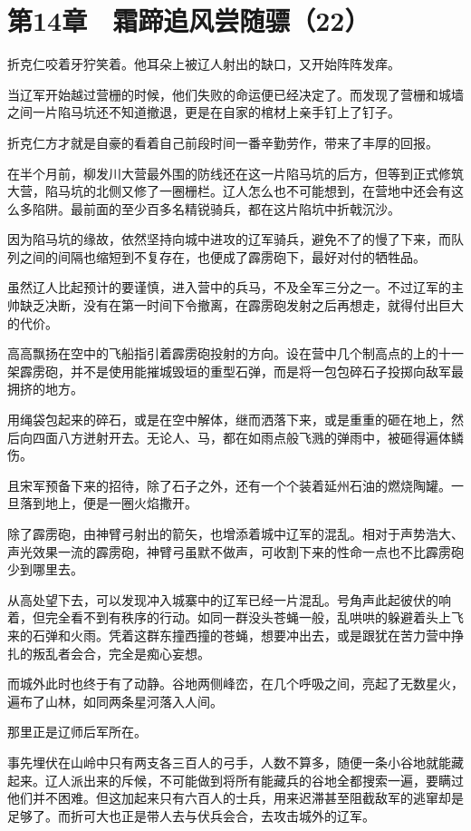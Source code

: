 \section{第14章　霜蹄追风尝随骠（22）}

折克仁咬着牙狞笑着。他耳朵上被辽人射出的缺口，又开始阵阵发痒。

当辽军开始越过营栅的时候，他们失败的命运便已经决定了。而发现了营栅和城墙之间一片陷马坑还不知道撤退，更是在自家的棺材上亲手钉上了钉子。

折克仁方才就是自豪的看着自己前段时间一番辛勤劳作，带来了丰厚的回报。

在半个月前，柳发川大营最外围的防线还在这一片陷马坑的后方，但等到正式修筑大营，陷马坑的北侧又修了一圈栅栏。辽人怎么也不可能想到，在营地中还会有这么多陷阱。最前面的至少百多名精锐骑兵，都在这片陷坑中折戟沉沙。

因为陷马坑的缘故，依然坚持向城中进攻的辽军骑兵，避免不了的慢了下来，而队列之间的间隔也缩短到不复存在，也便成了霹雳砲下，最好对付的牺牲品。

虽然辽人比起预计的要谨慎，进入营中的兵马，不及全军三分之一。不过辽军的主帅缺乏决断，没有在第一时间下令撤离，在霹雳砲发射之后再想走，就得付出巨大的代价。

高高飘扬在空中的飞船指引着霹雳砲投射的方向。设在营中几个制高点的上的十一架霹雳砲，并不是使用能摧城毁垣的重型石弹，而是将一包包碎石子投掷向敌军最拥挤的地方。

用绳袋包起来的碎石，或是在空中解体，继而洒落下来，或是重重的砸在地上，然后向四面八方迸射开去。无论人、马，都在如雨点般飞溅的弹雨中，被砸得遍体鳞伤。

且宋军预备下来的招待，除了石子之外，还有一个个装着延州石油的燃烧陶罐。一旦落到地上，便是一圈火焰撒开。

除了霹雳砲，由神臂弓射出的箭矢，也增添着城中辽军的混乱。相对于声势浩大、声光效果一流的霹雳砲，神臂弓虽默不做声，可收割下来的性命一点也不比霹雳砲少到哪里去。

从高处望下去，可以发现冲入城寨中的辽军已经一片混乱。号角声此起彼伏的响着，但完全看不到有秩序的行动。如同一群没头苍蝇一般，乱哄哄的躲避着头上飞来的石弹和火雨。凭着这群东撞西撞的苍蝇，想要冲出去，或是跟犹在苦力营中挣扎的叛乱者会合，完全是痴心妄想。

而城外此时也终于有了动静。谷地两侧峰峦，在几个呼吸之间，亮起了无数星火，遍布了山林，如同两条星河落入人间。

那里正是辽师后军所在。

事先埋伏在山岭中只有两支各三百人的弓手，人数不算多，随便一条小谷地就能藏起来。辽人派出来的斥候，不可能做到将所有能藏兵的谷地全都搜索一遍，要瞒过他们并不困难。但这加起来只有六百人的士兵，用来迟滞甚至阻截敌军的逃窜却是足够了。而折可大也正是带人去与伏兵会合，去攻击城外的辽军。

